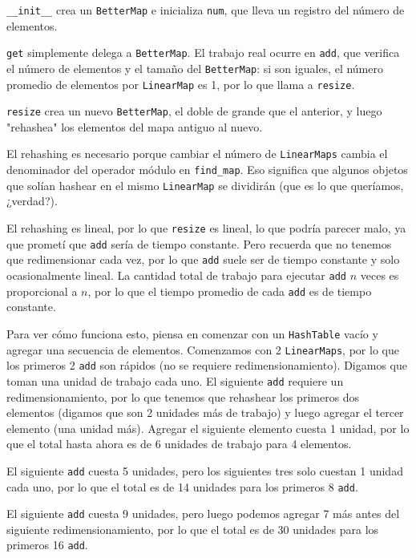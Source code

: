 \texttt{\_\_init\_\_} crea un \texttt{BetterMap} e inicializa \texttt{num}, que lleva un registro del número de elementos.

\texttt{get} simplemente delega a \texttt{BetterMap}. El trabajo real ocurre en \texttt{add}, que verifica el número de elementos y el tamaño del \texttt{BetterMap}: si son iguales, el número promedio de elementos por \texttt{LinearMap} es 1, por lo que llama a \texttt{resize}.

\texttt{resize} crea un nuevo \texttt{BetterMap}, el doble de grande que el anterior, y luego "rehashea" los elementos del mapa antiguo al nuevo.

El rehashing es necesario porque cambiar el número de \texttt{LinearMaps} cambia el denominador del operador módulo en \texttt{find\_map}. Eso significa que algunos objetos que solían hashear en el mismo \texttt{LinearMap} se dividirán (que es lo que queríamos, ¿verdad?).

El rehashing es lineal, por lo que \texttt{resize} es lineal, lo que podría parecer malo, ya que prometí que \texttt{add} sería de tiempo constante. Pero recuerda que no tenemos que redimensionar cada vez, por lo que \texttt{add} suele ser de tiempo constante y solo ocasionalmente lineal. La cantidad total de trabajo para ejecutar \texttt{add} \( n \) veces es proporcional a \( n \), por lo que el tiempo promedio de cada \texttt{add} es de tiempo constante.

Para ver cómo funciona esto, piensa en comenzar con un \texttt{HashTable} vacío y agregar una secuencia de elementos. Comenzamos con 2 \texttt{LinearMaps}, por lo que los primeros 2 \texttt{add} son rápidos (no se requiere redimensionamiento). Digamos que toman una unidad de trabajo cada uno. El siguiente \texttt{add} requiere un redimensionamiento, por lo que tenemos que rehashear los primeros dos elementos (digamos que son 2 unidades más de trabajo) y luego agregar el tercer elemento (una unidad más). Agregar el siguiente elemento cuesta 1 unidad, por lo que el total hasta ahora es de 6 unidades de trabajo para 4 elementos.

El siguiente \texttt{add} cuesta 5 unidades, pero los siguientes tres solo cuestan 1 unidad cada uno, por lo que el total es de 14 unidades para los primeros 8 \texttt{add}.

El siguiente \texttt{add} cuesta 9 unidades, pero luego podemos agregar 7 más antes del siguiente redimensionamiento, por lo que el total es de 30 unidades para los primeros 16 \texttt{add}.

